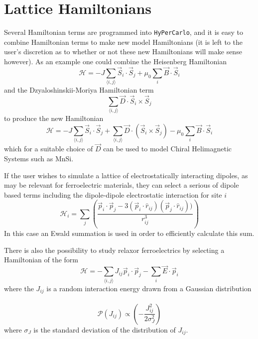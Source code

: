 \documentclass[aps,prb,twocolumn,showpacs,superscriptaddress,floatfix]{revtex4-1}
\begin{document}
\section{Lattice Hamiltonians}
Several Hamiltonian terms are programmed into {\tt HyPerCarlo}, and it is easy to combine Hamiltonian terms to make new model Hamiltonians (it is left to the user's discretion as to whether or not these new Hamiltonians will make sense however). As an example one could combine the Heisenberg Hamiltonian
\begin{equation}
\mathcal{H} = -J\sum_{\langle i,j\rangle} \vec{S}_i \cdot \vec{S}_j +  \mu_0\sum_i\vec{B}\cdot\vec{S}_i
\end{equation}
and the Dzyaloshinskii-Moriya Hamiltonian term 
\begin{equation}
\sum_{\langle i,j \rangle} \vec{D}\cdot\vec{S}_i \times \vec{S}_j
\end{equation}
to produce the new Hamiltonian
\begin{equation}
\mathcal{H} = -J\sum_{\langle i,j\rangle} \vec{S}_i \cdot \vec{S}_j + \sum_{\langle i,j \rangle} \vec{D}\cdot (\vec{S}_i \times \vec{S}_j) - \mu_0\sum_i\vec{B}\cdot\vec{S}_i
\end{equation}
which for a suitable choice of $\vec{D}$ can be used to model Chiral Helimagnetic Systems such as MnSi.

If the user wishes to simulate a lattice of electrostatically interacting dipoles, as may be relevant for ferroelectric materials, they can select a serious of dipole based terms including the dipole-dipole electrostatic interaction for site $i$
\begin{equation}
\mathcal{H}_i = \sum_j \left( \frac{ \vec{p}_i\cdot\vec{p}_j-3 (\vec{p}_i\cdot\hat{r}_{ij}) (\vec{p}_j\cdot\hat{r}_{ij}))}{ r_{ij}^3} \right)
\end{equation}
In this case an Ewald summation is used in order to efficiently calculate this sum.

There is also the possibility to study relaxor ferroelectrics by selecting a Hamiltonian of the form
\begin{equation}
\mathcal{H} = -\sum_{\langle i,j\rangle} J_{ij} \vec{p}_i \cdot \vec{p}_j - \sum_i\vec{E}\cdot\vec{p}_i
\end{equation}
where the $J_{ij}$ is a random interaction energy drawn from a Gaussian distribution ~\cite{Lao}
\begin{equation}
\mathcal{P}(J_{ij}) \propto \left( -\frac{J_{ij}^2}{2\sigma_{J}^2} \right)
\end{equation}
where $\sigma_J$ is the standard deviation of the distribution of $J_{ij}$.
\end{document}
